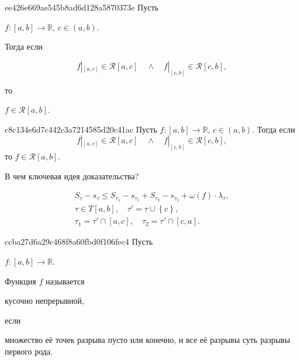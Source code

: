 \begin{note}{ee426e669ae545b8ad6d128a5870373e}
    Пусть \begin{icloze}{3}\({ f : [a, b] \to \mathbb R }\), \({ c \in (a, b) }\).\end{icloze} Тогда если
    \begin{icloze}{1}
        \[
            f|_{[a, c]} \in \mathcal R[a, c] \quad \land \quad f|_{[c, b]} \in \mathcal R[c, b],
        \]
    \end{icloze}
    то \begin{icloze}{2}\({ f \in \mathcal R[a, b] }\).\end{icloze}
\end{note}

\begin{note}{c8c134e6d7c442c3a7214585d20c41ac}
    Пусть \({ f : [a, b] \to \mathbb R }\), \({ c \in (a, b) }\). Тогда если
    \[
        f|_{[a, c]} \in \mathcal R[a, c] \quad \land \quad f|_{[c, b]} \in \mathcal R[c, b],
    \]
    то \({ f \in \mathcal R[a, b] }\).

    В чем ключевая идея доказательства?

    \begin{cloze}{1}
        \[
            \begin{gathered}
                S_\tau - s_\tau \leqslant S_{\tau_1} - s_{\tau_1} + S_{\tau_2} - s_{\tau_2} + \omega(f) \cdot \lambda_\tau, \\
                \tau \in T[a, b], \quad \tau' = \tau \cup \left\{ c \right\}, \\
                \tau_1 = \tau' \cap [a, c], \quad \tau_2 = \tau' \cap [c, a].
            \end{gathered}
        \]
    \end{cloze}
\end{note}

\begin{note}{ccba27d6a29c468f8a60fbd0f106fec4}
    Пусть \begin{icloze}{3}\({ f : [a, b] \to \mathbb R }\).\end{icloze} Функция \({ f }\) называется \begin{icloze}{2}кусочно непрерывной,\end{icloze} если \begin{icloze}{1}множество её точек разрыва пусто или конечно, и все её разрывы суть разрывы первого рода.\end{icloze}
\end{note}

